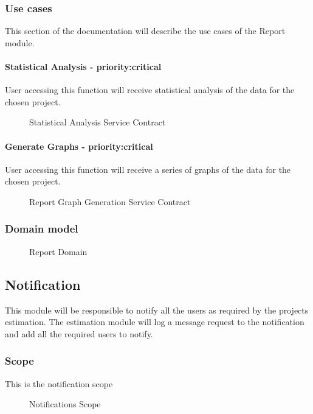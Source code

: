 \subsubsection{Use cases}
	This section of the documentation will describe the use cases of the Report module.
	\paragraph{Statistical Analysis - priority:critical}
	User accessing this function will receive statistical analysis of the data for the chosen project.
	\begin{figure}[H]
	    	\centering
	    	\caption{Statistical Analysis Service Contract}
	    	\label{fig:Report_getStatistics.png Contract}
   	\end{figure}
	\paragraph{Generate Graphs - priority:critical}
	User accessing this function will receive a series of graphs of the data for the chosen project. 
	\begin{figure}[H]
	    	\centering
	    	\caption{Report Graph Generation Service Contract}
	    	\label{fig:Report_GraphGeneration.png Contract}
   	\end{figure}

\subsubsection{Domain model}
	\begin{figure}[H]
	    	\centering
	    	\caption{Report Domain}
	    	\label{fig:Report_Domain.png}
   	\end{figure}
\subsection{Notification}
This module will be responsible to notify all the users as required by the projects estimation. The estimation module will log a message request to the notification and add all the required users to notify.
\subsubsection{Scope}
This is the notification scope
	\begin{figure}[H]
	    	\centering
	    	\caption{Notifications Scope}
	    	\label{fig:Notification_Scope}
   	\end{figure}
